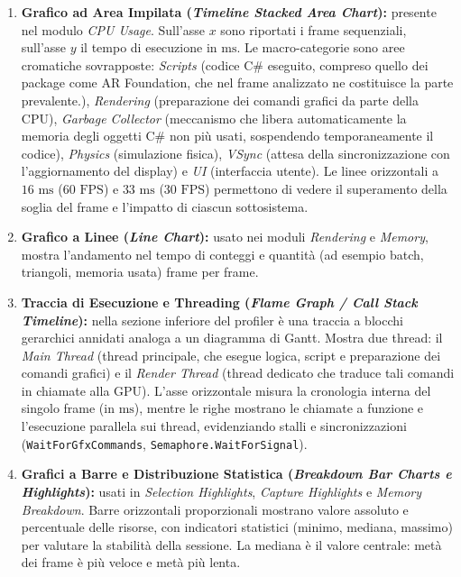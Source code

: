 \begin{enumerate}
\item \textbf{Grafico ad Area Impilata (\textit{Timeline Stacked Area Chart}):} presente nel modulo \textit{CPU Usage}. Sull'asse $x$ sono riportati i frame sequenziali, sull'asse $y$ il tempo di esecuzione in $\text{ms}$. Le macro-categorie sono aree cromatiche sovrapposte: \textit{Scripts} (codice C\# eseguito, compreso quello dei package come AR Foundation, che nel frame analizzato ne costituisce la parte prevalente.), \textit{Rendering} (preparazione dei comandi grafici da parte della CPU), \textit{Garbage Collector} (meccanismo che libera automaticamente la memoria degli oggetti C\# non più usati, sospendendo temporaneamente il codice), \textit{Physics} (simulazione fisica), \textit{VSync} (attesa della sincronizzazione con l'aggiornamento del display) e \textit{UI} (interfaccia utente). Le linee orizzontali a $16\text{ ms}$ ($60\text{ FPS}$) e $33\text{ ms}$ ($30\text{ FPS}$) permettono di vedere il superamento della soglia del frame e l'impatto di ciascun sottosistema.

\item \textbf{Grafico a Linee (\textit{Line Chart}):} usato nei moduli \textit{Rendering} e \textit{Memory}, mostra l'andamento nel tempo di conteggi e quantità (ad esempio batch, triangoli, memoria usata) frame per frame.

\item \textbf{Traccia di Esecuzione e Threading (\textit{Flame Graph / Call Stack Timeline}):} nella sezione inferiore del profiler è una traccia a blocchi gerarchici annidati analoga a un diagramma di Gantt. Mostra due thread: il \textit{Main Thread} (thread principale, che esegue logica, script e preparazione dei comandi grafici) e il \textit{Render Thread} (thread dedicato che traduce tali comandi in chiamate alla GPU). L'asse orizzontale misura la cronologia interna del singolo frame (in $\text{ms}$), mentre le righe mostrano le chiamate a funzione e l'esecuzione parallela sui thread, evidenziando stalli e sincronizzazioni (\texttt{WaitForGfx\allowbreak Commands}, \texttt{Semaphore.\allowbreak WaitForSignal}).

\item \textbf{Grafici a Barre e Distribuzione Statistica (\textit{Breakdown Bar Charts e Highlights}):} usati in \textit{Selection Highlights}, \textit{Capture Highlights} e \textit{Memory Breakdown}. Barre orizzontali proporzionali mostrano valore assoluto e percentuale delle risorse, con indicatori statistici (minimo, mediana, massimo) per valutare la stabilità della sessione. La mediana è il valore centrale: metà dei frame è più veloce e metà più lenta.
\end{enumerate}

